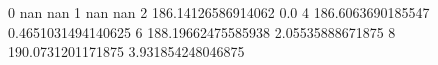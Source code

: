 0 nan nan
1 nan nan
2 186.14126586914062 0.0
4 186.6063690185547 0.4651031494140625
6 188.19662475585938 2.05535888671875
8 190.0731201171875 3.931854248046875
